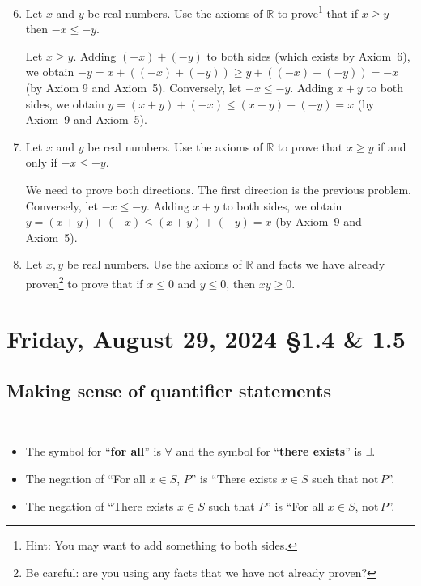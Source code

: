 \documentclass[12pt]{amsart}
\def\Fr{Friday}
\newcommand{\R}{{\mathbb{R}}}
\numberwithin{equation}{section}
\theoremstyle{plain} %
\newcommand{\Aug}[3]{\section{#2, August #1, 2024 \quad \S#3}}
\theoremstyle{definition}
\theoremstyle{remark}
\begin{document}
\begin{enumerate}\setcounter{enumi}{5}

\item Let $x$ and $y$ be real numbers. Use the axioms of $\R$ to prove\footnote{Hint: You may want to add something to both sides.} that if $x \geq y$ then $-x \leq -y$.


\begin{framed}
Let $x\geq y$. Adding $(-x) + (-y)$ to both sides (which exists by Axiom~6), we obtain $-y=x+((-x)+ (-y)) \geq y+((-x)+(-y)) = -x$ (by Axiom 9 and Axiom~5).
	Conversely, let $-x \leq -y$. Adding $x+y$ to both sides, we obtain $y=(x+y)+(-x) \leq (x+y)+(-y) = x$ (by Axiom~9 and Axiom~5).
	\end{framed}

\item Let $x$ and $y$ be real numbers. Use the axioms of $\R$ to prove that $x \geq y$ if and only if $-x \leq -y$.


\begin{framed}
We need to prove both directions. The first direction is the previous problem. Conversely, let $-x \leq -y$. Adding $x+y$ to both sides, we obtain $y=(x+y)+(-x) \leq (x+y)+(-y) = x$ (by Axiom~9 and Axiom~5).
\end{framed}

\item Let $x,y$ be real numbers. Use the axioms of $\R$ and facts we have already proven\footnote{Be careful: are you using any facts that we have not already proven?} to prove that if $x\leq 0$ and $y\leq 0$, then $xy\geq 0$. 






\end{enumerate}


\newpage

\Aug{29}{\Fr}{1.4 \& 1.5}



\subsection*{Making sense of quantifier statements} 

\

\begin{framed}
\begin{itemize}
\item The symbol for ``\textbf{for all}'' is $\forall$\index{$\forall$} and the symbol for ``\textbf{there exists}'' is $\exists$.\index{$\exists$}
\item The negation of ``For all $x\in S$, $P$'' is ``There exists $x\in S$ such that $\mathrm{not} \, P$''.
\item The negation of ``There exists $x\in S$ such that $P$'' is ``For all $x\in S$, $\mathrm{not} \, P$''.
\end{itemize}
\end{framed}
\end{document}
